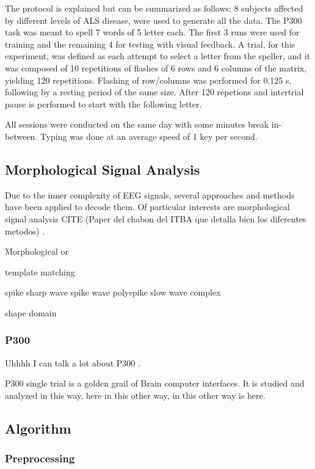 \documentclass[entropy,article,submit,moreauthors,pdftex,10pt,a4paper]{mdpi}
\begin{document}
The protocol is explained \citep{Riccio2013} but can be summarized as follows:  8 subjects affected by different levels of ALS disease, were used to generate all the data. The P300 task was meant to spell 7 words of 5 letter each.  The first 3 runs were used for training and the remaining 4 for testing with visual feedback.  A trial, for this experiment, was defined as each attempt to select a letter from the speller, and it was composed of 10 repetitions of flashes of 6 rows and 6 columns of the matrix, yielding 120 repetitions.  Flashing of row/columns was performed for 0.125 s, following by a resting period of the same size.  After 120 repetions and intertrial pause is performed to start with the following letter.

All sessions were conducted on the same day with some minutes break in-between. Typing was done at an average speed of 1 key per second.  

\subsection{Morphological Signal Analysis}

Due to the inner complexity of EEG signals, several approaches and methods have been applied to decode them.  Of particular interests are morphological signal analysis 
CITE (Paper del chabon del ITBA que detalla bien los diferentes metodos) \citep{Alvarado-Gonzalez2016}.

Morphological or 

template matching

spike
sharp wave
spike wave
polyspike 
slow wave complex

shape domain

\subsubsection{P300}

Uhhhh I can talk a lot about P300 \citep{Knuth2006}.

P300 single trial is a golden grail of Brain computer interfaces.  It is studied and analyzed in this way, here in this other way, in this other way is here.

\subsection{Algorithm}

\subsubsection{Preprocessing}
\end{document}
